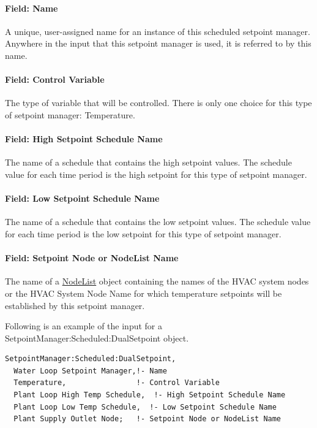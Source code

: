 \paragraph{Field: Name}\label{field-name-1-039}

A unique, user-assigned name for an instance of this scheduled setpoint manager. Anywhere in the input that this setpoint manager is used, it is referred to by this name.

\paragraph{Field: Control Variable}\label{field-control-variable-1}

The type of variable that will be controlled. There is only one choice for this type of setpoint manager: Temperature.

\paragraph{Field: High Setpoint Schedule Name}\label{field-high-setpoint-schedule-name}

The name of a schedule that contains the high setpoint values. The schedule value for each time period is the high setpoint for this type of setpoint manager.

\paragraph{Field: Low Setpoint Schedule Name}\label{field-low-setpoint-schedule-name}

The name of a schedule that contains the low setpoint values. The schedule value for each time period is the low setpoint for this type of setpoint manager.

\paragraph{Field: Setpoint Node or NodeList Name}\label{field-setpoint-node-or-nodelist-name-1}

The name of a \hyperref[nodelist]{NodeList} object containing the names of the HVAC system nodes or the HVAC System Node Name for which temperature setpoints will be established by this setpoint manager.

Following is an example of the input for a SetpointManager:Scheduled:DualSetpoint object.

\begin{lstlisting}
SetpointManager:Scheduled:DualSetpoint,
  Water Loop Setpoint Manager,!- Name
  Temperature,                !- Control Variable
  Plant Loop High Temp Schedule,  !- High Setpoint Schedule Name
  Plant Loop Low Temp Schedule,  !- Low Setpoint Schedule Name
  Plant Supply Outlet Node;   !- Setpoint Node or NodeList Name
\end{lstlisting}

